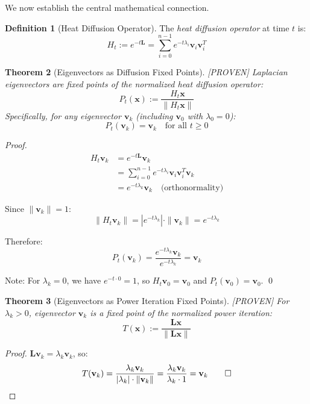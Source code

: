 \documentclass[11pt,a4paper]{article}
\newtheorem{theorem}{Theorem}[section]
\theoremstyle{definition}
\newtheorem{definition}[theorem]{Definition}
\theoremstyle{remark}
\newcommand{\norm}[1]{\| #1 \|}
\newcommand{\Lap}{\mathbf{L}}
\newcommand{\proven}{\textcolor{green!50!black}{[PROVEN]}}
\begin{document}
We now establish the central mathematical connection.

\begin{definition}[Heat Diffusion Operator]
The \emph{heat diffusion operator} at time $t$ is:
\[
H_t := e^{-t\Lap} = \sum_{i=0}^{n-1} e^{-t\lambda_i} \mathbf{v}_i \mathbf{v}_i^T
\]
\end{definition}

\begin{theorem}[Eigenvectors as Diffusion Fixed Points] \proven
\label{thm:diffusion-fixed}
Laplacian eigenvectors are fixed points of the normalized heat diffusion operator:
\[
P_t(\mathbf{x}) := \frac{H_t \mathbf{x}}{\norm{H_t \mathbf{x}}}
\]
Specifically, for any eigenvector $\mathbf{v}_k$ (including $\mathbf{v}_0$ with $\lambda_0 = 0$):
\[
P_t(\mathbf{v}_k) = \mathbf{v}_k \quad \text{for all } t \geq 0
\]
\end{theorem}

\begin{proof}
\begin{align*}
H_t \mathbf{v}_k &= e^{-t\Lap} \mathbf{v}_k \\
&= \sum_{i=0}^{n-1} e^{-t\lambda_i} \mathbf{v}_i \mathbf{v}_i^T \mathbf{v}_k \\
&= e^{-t\lambda_k} \mathbf{v}_k \quad \text{(orthonormality)}
\end{align*}

Since $\norm{\mathbf{v}_k} = 1$:
\[
\norm{H_t \mathbf{v}_k} = |e^{-t\lambda_k}| \cdot \norm{\mathbf{v}_k} = e^{-t\lambda_k}
\]

Therefore:
\[
P_t(\mathbf{v}_k) = \frac{e^{-t\lambda_k} \mathbf{v}_k}{e^{-t\lambda_k}} = \mathbf{v}_k
\]

Note: For $\lambda_k = 0$, we have $e^{-t \cdot 0} = 1$, so $H_t \mathbf{v}_0 = \mathbf{v}_0$ and $P_t(\mathbf{v}_0) = \mathbf{v}_0$. \qed
\end{proof}

\begin{theorem}[Eigenvectors as Power Iteration Fixed Points] \proven
\label{thm:power-fixed}
For $\lambda_k > 0$, eigenvector $\mathbf{v}_k$ is a fixed point of the normalized power iteration:
\[
T(\mathbf{x}) := \frac{\Lap \mathbf{x}}{\norm{\Lap \mathbf{x}}}
\]
\end{theorem}

\begin{proof}
$\Lap \mathbf{v}_k = \lambda_k \mathbf{v}_k$, so:
\[
T(\mathbf{v}_k) = \frac{\lambda_k \mathbf{v}_k}{|\lambda_k| \cdot \norm{\mathbf{v}_k}} = \frac{\lambda_k \mathbf{v}_k}{\lambda_k \cdot 1} = \mathbf{v}_k \qed
\]
\end{proof}
\end{document}
